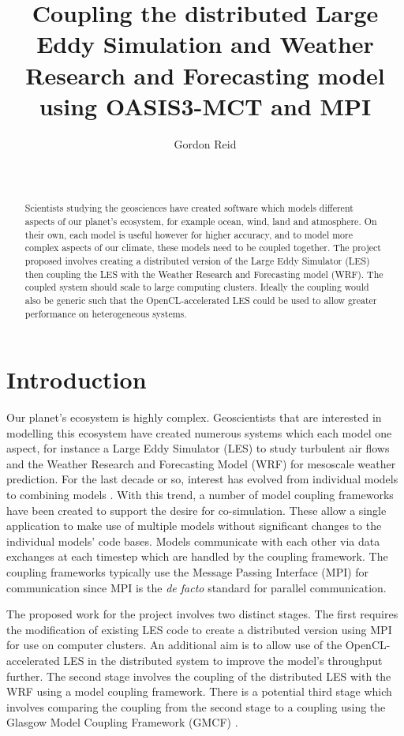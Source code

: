 \documentclass{acm_proc_article-sp}
\title{Coupling the distributed Large Eddy Simulation and Weather Research and
Forecasting model using OASIS3-MCT and MPI}
\author{
    \alignauthor
    Gordon Reid\\
    \affaddr{School of Computing Science}\\
    \affaddr{University of Glasgow}\\
    \email{1002536r@student.gla.ac.uk}
}
\renewcommand{\_}{\underscore\hspace{0pt}}
\begin{document}
\maketitle

\begin{abstract}

Scientists studying the geosciences have created software which models different
aspects of our planet's ecosystem, for example ocean, wind, land and atmosphere.
On their own, each model is useful however for higher accuracy, and to model
more complex aspects of our climate, these models need to be coupled together.
The project proposed involves creating a distributed version of the Large Eddy
Simulator (LES) then coupling the LES with the Weather Research and Forecasting
model (WRF). The coupled system should scale to large computing clusters.
Ideally the coupling would also be generic such that the OpenCL-accelerated LES
could be used to allow greater performance on heterogeneous systems.

\end{abstract}

\section*{Introduction}

Our planet's ecosystem is highly complex. Geoscientists that are interested in
modelling this ecosystem have created numerous systems which each model one
aspect, for instance a Large Eddy Simulator (LES) to study turbulent air flows
\cite{Nakayama2011,Nakayama2012} and the Weather Research and Forecasting Model
(WRF) for mesoscale weather prediction. For the last decade or so, interest has
evolved from individual models to combining models \cite{Michalakes2010}. With
this trend, a number of model coupling frameworks have been created to support
the desire for co-simulation. These allow a single application to make use of
multiple models without significant changes to the individual models' code
bases. Models communicate with each other via data exchanges at each timestep
which are handled by the coupling framework. The coupling frameworks typically
use the Message Passing Interface (MPI) for communication since MPI is the
\textit{de facto} standard for parallel communication.

The proposed work for the project involves two distinct stages. The first
requires the modification of existing LES code to create a distributed version
using MPI for use on computer clusters. An additional aim is to allow use of the
OpenCL-accelerated LES \cite{Vanderbauwhede2014} in the distributed system to
improve the model's throughput further. The second stage involves the coupling
of the distributed LES with the WRF using a model coupling framework. There is a
potential third stage which involves comparing the coupling from the second
stage to a coupling using the Glasgow Model Coupling Framework (GMCF)
\cite{Vanderbauwhede2014}.
\end{document}
